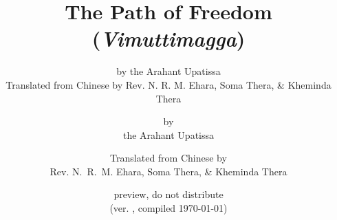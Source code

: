 

\def\thepageIssue{\href{https://github.com/eudoxos/vism/issues/new?title=Vimuttimagga\%20issue\%20at\%20page\%20\thepage\&body=(\vismCommitTimestampQuery)}{\thepage}}
\def\vismAssertFootnoteCounter#1{\relax}
\usepackage[stable]{footmisc}



	\title{The Path of Freedom \\ (\emph{Vimuttimagga})}
	\date{preview, do not distribute \\ (ver. \vismCommitHref, compiled \today)}
	\ifplastex
		\author{by the Arahant Upatissa \\ Translated from Chinese by Rev. N. R. M. Ehara, Soma Thera, \& Kheminda Thera}
	\else
		\author{by \\ the Arahant Upatissa \and Translated from Chinese by \\ Rev. N.~R.~M. Ehara, Soma Thera, \& Kheminda Thera}
	\fi
	\maketitle

	\frontmatter
		\bgroup
			\ifplastex\else\renewcommand{\baselinestretch}{0.2}\normalsize\fi
			\tableofcontents
		\egroup
		

